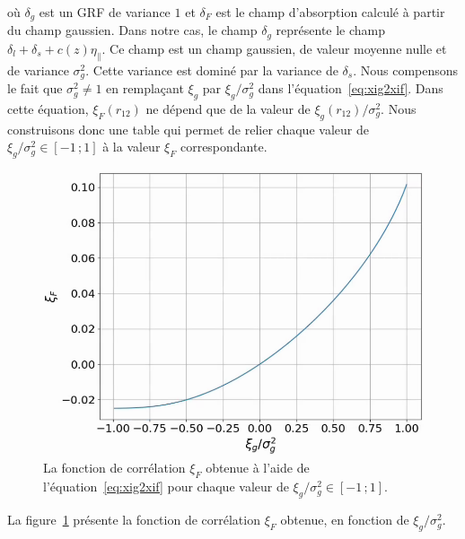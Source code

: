 où $\delta_g$ est un GRF de variance $1$ et $\delta_F$ est le champ d'absorption calculé à partir du champ gaussien.
Dans notre cas, le champ $\delta_g$ représente le champ $\delta_l + \delta_s + c(z)\eta_{\parallel}$. Ce champ est un champ gaussien, de valeur moyenne nulle et de variance $\sigma_g^2$. Cette variance est dominé par la variance de $\delta_s$.
Nous compensons le fait que $\sigma_g^2 \neq 1$ en remplaçant $\xi_g$ par $\xi_g / \sigma_g^2$ dans l'équation~\ref{eq:xig2xif}. %
Dans cette équation, $\xi_F(r_{12})$ ne dépend que de la valeur de $\xi_g(r_{12})/ \sigma_g^2$. Nous construisons donc une table qui permet de relier chaque valeur de $\xi_g/ \sigma_g^2 \in [-1 \, ; 1]$ à la valeur $\xi_F$ correspondante.
\begin{figure}
  \centering
  \includegraphics[scale=0.4]{xiF_vs_xig}
  \caption{La fonction de corrélation $\xi_F$ obtenue à l'aide de l'équation~\ref{eq:xig2xif} pour chaque valeur de $\xi_g/ \sigma_g^2 \in [-1 \, ; 1]$.}
  \label{fig:xiF_vs_xig}
\end{figure}
La figure~\ref{fig:xiF_vs_xig} présente la fonction de corrélation $\xi_F$ obtenue, en fonction de $\xi_g/ \sigma_g^2$.
